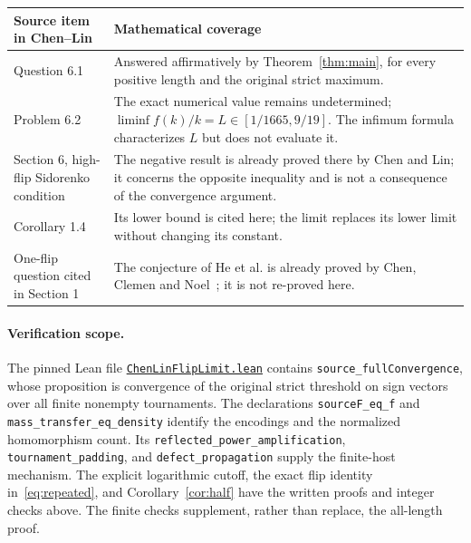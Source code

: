 \documentclass[11pt]{article}
\begin{document}
\begin{center}
\small
\begin{tabular}{@{}p{.30\linewidth}p{.62\linewidth}@{}}
\toprule
Source item in Chen--Lin~\cite{CL} & Mathematical coverage\\
\midrule
Question 6.1 & Answered affirmatively by Theorem~\ref{thm:main}, for every
positive length and the original strict maximum.\\[3pt]
Problem 6.2 & The exact numerical value remains undetermined;
$\liminf f(k)/k=L\in[1/1665,9/19]$. The infimum formula characterizes $L$
but does not evaluate it.\\[3pt]
Section 6, high-flip Sidorenko condition & The negative result is already
proved there by Chen and Lin; it concerns the opposite inequality and is
not a consequence of the convergence argument.\\[3pt]
Corollary 1.4 & Its lower bound is cited here; the limit replaces its
lower limit without changing its constant.\\
One-flip question cited in Section 1 & The conjecture of He et al. is already
proved by Chen, Clemen and Noel~\cite{CCN}; it is not re-proved here.\\
\bottomrule
\end{tabular}
\end{center}

\paragraph{Verification scope.}
The pinned Lean file
\href{https://github.com/the-omega-institute/trureturing/blob/81968a52b83b3d79d4db8e60c34e05d953675dc0/D5/S3/Combinatorics/ExtremalDensity/ChenLinFlipLimit.lean}{\texttt{ChenLinFlipLimit.lean}}
contains \nolinkurl{source_fullConvergence}, whose proposition is convergence
of the original strict threshold on sign vectors over all finite nonempty
tournaments. The declarations \nolinkurl{sourceF_eq_f} and
\nolinkurl{mass_transfer_eq_density} identify the encodings and the normalized
homomorphism count. Its \nolinkurl{reflected_power_amplification},
\nolinkurl{tournament_padding}, and \nolinkurl{defect_propagation} supply the
finite-host mechanism. The explicit logarithmic cutoff, the exact flip identity
in~\eqref{eq:repeated}, and Corollary~\ref{cor:half} have the written proofs
and integer checks above. The finite checks supplement, rather than replace,
the all-length proof.
\end{document}
